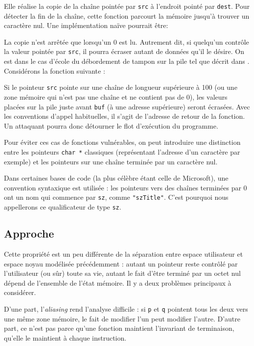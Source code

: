 Elle réalise la copie de la chaîne pointée par \texttt{src} à l'endroit pointé
par \texttt{dest}. Pour détecter la fin de la chaîne, cette fonction parcourt la
mémoire jusqu'à trouver un caractère nul. Une implémentation naïve pourrait être:


La copie n'est arrêtée que lorsqu'un 0 est lu. Autrement dit, si quelqu'un
contrôle la valeur pointée par \texttt{src}, il pourra écraser autant de données
qu'il le désire. On est dans le cas d'école du débordement de tampon sur la pile
tel que décrit dans \cite{SmashingTheStack}. Considérons la fonction suivante :


Si le pointeur \texttt{src} pointe sur une chaîne de longueur supérieure à 100
(ou une zone mémoire qui n'est pas une chaîne et ne contient pas de 0), les
valeurs placées sur la pile juste avant \texttt{buf} (à une adresse supérieure)
seront écrasées. Avec les conventions d'appel habituelles, il s'agit de
l'adresse de retour de la fonction. Un attaquant pourra donc détourner le flot
d'exécution du programme.

Pour éviter ces cas de fonctions vulnérables, on peut introduire une distinction
entre les pointeurs \texttt{char *} classiques (représentant l'adresse d'un
caractère par exemple) et les pointeurs sur une chaîne terminée par un caractère
nul.

Dans certaines bases de code (la plus célèbre étant celle de Microsoft), une
convention syntaxique est utilisée : les pointeurs vers des chaînes terminées
par 0 ont un nom qui commence par \texttt{sz}, comme \texttt{"szTitle"}. C'est
pourquoi nous appellerons ce qualificateur de type \texttt{sz}.

\subsection{Approche}

Cette propriété est un peu différente de la séparation entre espace utilisateur
et espace noyau modélisée précédemment : autant un pointeur reste contrôlé par
l'utilisateur (ou sûr) toute sa vie, autant le fait d'être terminé par un octet
nul dépend de l'ensemble de l'état mémoire. Il y a deux problèmes principaux à
considérer.

D'une part, l'\emph{aliasing} rend l'analyse difficile : si \texttt{p} et
\texttt{q} pointent tous les deux vers une même zone mémoire, le fait de
modifier l'un peut modifier l'autre. D'autre part, ce n'est pas parce qu'une
fonction maintient l'invariant de terminaison, qu'elle le maintient à chaque
instruction.

